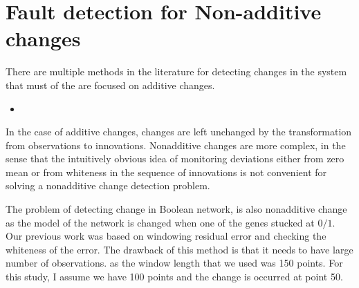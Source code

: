 \documentclass[9pt]{article}
\begin{document}
\section{Fault detection for Non-additive changes }
There are multiple methods in the literature for detecting changes in the system that must of the are focused on additive changes.
\begin{itemize}
\item 
\end{itemize}
In the case of additive changes, changes are left unchanged by the transformation from observations to innovations. Nonadditive changes are more complex, in the sense that the intuitively obvious idea of monitoring deviations either from zero mean or from whiteness in the sequence of innovations is not convenient for solving a nonadditive change detection problem.

The problem of detecting change in Boolean network, is also nonadditive change as the model of the network is changed when one of the genes stucked at $0/1$.
Our previous work was based on windowing residual error and checking the whiteness of the error.
The drawback of this method is that it needs to have large number of observations. as the window length that we used was 150 points.
For this study, I assume we have 100 points and the change is occurred at point 50.
\end{document}

